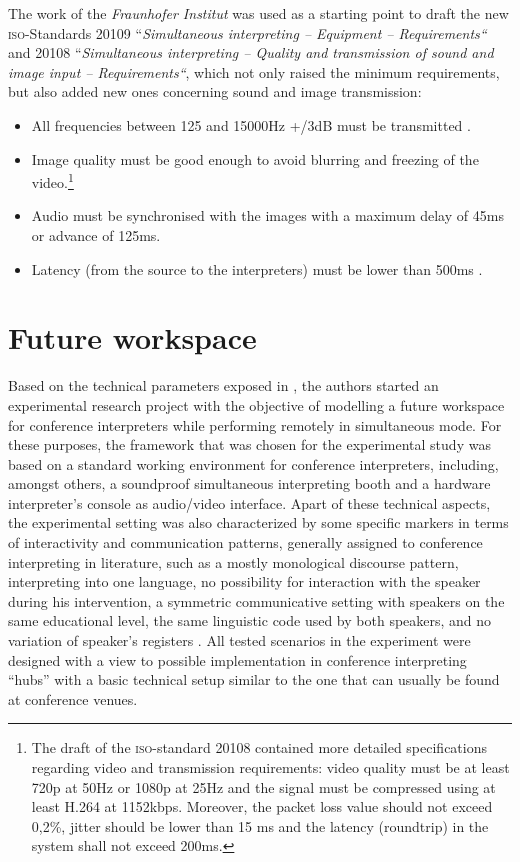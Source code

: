 \documentclass[output=paper]{langsci/langscibook}
\begin{document}
The work of the \textit{Fraunhofer Institut} was used as a starting point to draft the new \textsc{iso}-Standards 20109 “\textit{Simultaneous interpreting -- Equipment -- Requirements“} and 20108 “\textit{Simultaneous interpreting -- Quality and transmission of sound and image input -- Requirements“}, which not only raised the minimum requirements, but also added new ones concerning sound and image transmission:

\begin{itemize}
\item All frequencies between 125 and 15000Hz +/\textminus 3dB must be transmitted \citep[3]{ISO20109}.
\item Image quality must be good enough to avoid blurring and freezing of the video.\footnote{The draft of the \textsc{iso}-standard 20108 contained more detailed specifications regarding video and transmission requirements: video quality must be at least 720p at 50Hz or 1080p at 25Hz and the signal must be compressed using at least H.264 at 1152kbps. Moreover, the packet loss value should not exceed 0,2\%, jitter should be lower than 15 ms and the latency (roundtrip) in the system shall not exceed 200ms.}
\item Audio must be synchronised with the images with a maximum delay of 45ms or advance of 125ms.
\item Latency (from the source to the interpreters) must be lower than 500ms \citep[7--8]{ISO20108}.
\end{itemize}

\section{Future workspace}
\label{sec:ziegler:06}
Based on the technical parameters exposed in , the authors started an experimental research project with the objective of modelling a future workspace for conference interpreters while performing remotely in simultaneous mode. For these purposes, the framework that was chosen for the experimental study was based on a standard working environment for conference interpreters, including, amongst others, a soundproof simultaneous interpreting booth and a hardware interpreter’s console as audio/video interface. Apart of these technical aspects, the experimental setting was also characterized by some specific markers in terms of interactivity and communication patterns, generally assigned to conference interpreting in literature, such as a mostly monological discourse pattern, interpreting into one language, no possibility for interaction with the speaker during his intervention, a symmetric communicative setting with speakers on the same educational level, the same linguistic code used by both speakers, and no variation of speaker’s registers \citep[582--583]{Angelelli2000}. All tested scenarios in the experiment were designed with a view to possible implementation in conference interpreting “hubs” with a basic technical setup similar to the one that can usually be found at conference venues.
\end{document}
